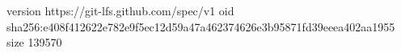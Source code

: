 version https://git-lfs.github.com/spec/v1
oid sha256:e408f412622e782e9f5ec12d59a47a462374626e3b95871fd39eeea402aa1955
size 139570
